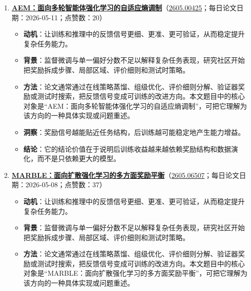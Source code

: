\begin{enumerate}[leftmargin=1.5em]
\begin{itemize}[leftmargin=1.5em]
    \item \textbf{方法}：论文通常通过在线策略蒸馏、组级优化、评价细则分解、验证器奖励或测试时搜索，把反馈信号变成可训练的改进方向。本文题目中的核心对象是“基于评价细则的在线策略蒸馏”，可把它理解为该方向的一种具体实现或问题重述。
    \item \textbf{洞察}：奖励信号越能贴近任务结构，后训练越可能稳定地产生能力增益。
    \item \textbf{结论}：它的结论价值在于说明后训练收益越来越依赖奖励结构和数据演化，而不是只依赖更大的模型。
  \end{itemize}
  \item \textbf{\href{https://huggingface.co/papers/2605.00425}{AEM：面向多轮智能体强化学习的自适应熵调制}}（\href{https://arxiv.org/abs/2605.00425}{2605.00425}；每日论文日期：2026-05-11；点赞数：20）
  \begin{itemize}[leftmargin=1.5em]
    \item \textbf{动机}：让训练和推理中的反馈信号更细、更准、更可验证，从而稳定提升复杂任务能力。
    \item \textbf{背景}：监督微调与单一偏好分数不足以解释复杂任务表现，研究社区开始把奖励拆成步骤、局部区域、评价细则和测试时策略。
    \item \textbf{方法}：论文通常通过在线策略蒸馏、组级优化、评价细则分解、验证器奖励或测试时搜索，把反馈信号变成可训练的改进方向。本文题目中的核心对象是“AEM：面向多轮智能体强化学习的自适应熵调制”，可把它理解为该方向的一种具体实现或问题重述。
    \item \textbf{洞察}：奖励信号越能贴近任务结构，后训练越可能稳定地产生能力增益。
    \item \textbf{结论}：它的结论价值在于说明后训练收益越来越依赖奖励结构和数据演化，而不是只依赖更大的模型。
  \end{itemize}
  \item \textbf{\href{https://huggingface.co/papers/2605.06507}{MARBLE：面向扩散强化学习的多方面奖励平衡}}（\href{https://arxiv.org/abs/2605.06507}{2605.06507}；每日论文日期：2026-05-08；点赞数：37）
  \begin{itemize}[leftmargin=1.5em]
    \item \textbf{动机}：让训练和推理中的反馈信号更细、更准、更可验证，从而稳定提升复杂任务能力。
    \item \textbf{背景}：监督微调与单一偏好分数不足以解释复杂任务表现，研究社区开始把奖励拆成步骤、局部区域、评价细则和测试时策略。
    \item \textbf{方法}：论文通常通过在线策略蒸馏、组级优化、评价细则分解、验证器奖励或测试时搜索，把反馈信号变成可训练的改进方向。本文题目中的核心对象是“MARBLE：面向扩散强化学习的多方面奖励平衡”，可把它理解为该方向的一种具体实现或问题重述。

\end{itemize}
\end{enumerate}
